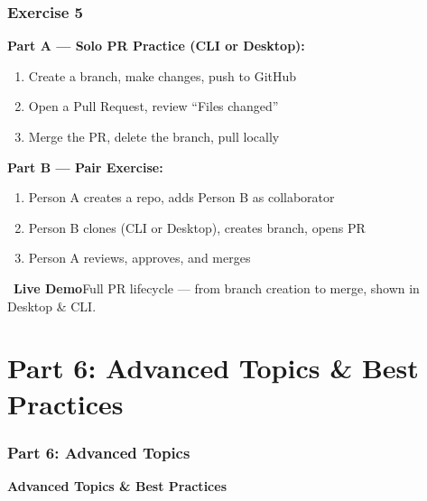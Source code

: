 \documentclass{beamer}
\newcommand{\livedemo}[1]{\begin{alertblock}{\faDesktop\ \textbf{Live Demo}}#1\end{alertblock}}
\begin{document}
\begin{frame}
\frametitle{Exercise 5}
\textbf{Part A --- Solo PR Practice (CLI or Desktop):}
\begin{enumerate}
    \item Create a branch, make changes, push to GitHub
    \item Open a Pull Request, review ``Files changed''
    \item Merge the PR, delete the branch, pull locally
\end{enumerate}

\vspace{2mm}
\textbf{Part B --- Pair Exercise:}
\begin{enumerate}
    \item Person A creates a repo, adds Person B as collaborator
    \item Person B clones (CLI or Desktop), creates branch, opens PR
    \item Person A reviews, approves, and merges
\end{enumerate}

\livedemo{Full PR lifecycle --- from branch creation to merge, shown in Desktop \& CLI.}
\end{frame}

\section{Part 6: Advanced Topics \& Best Practices}

\begin{frame}
\frametitle{Part 6: Advanced Topics}
\centering
\Large \textbf{Advanced Topics \& Best Practices}\\[6pt]
\end{frame}
\end{document}
